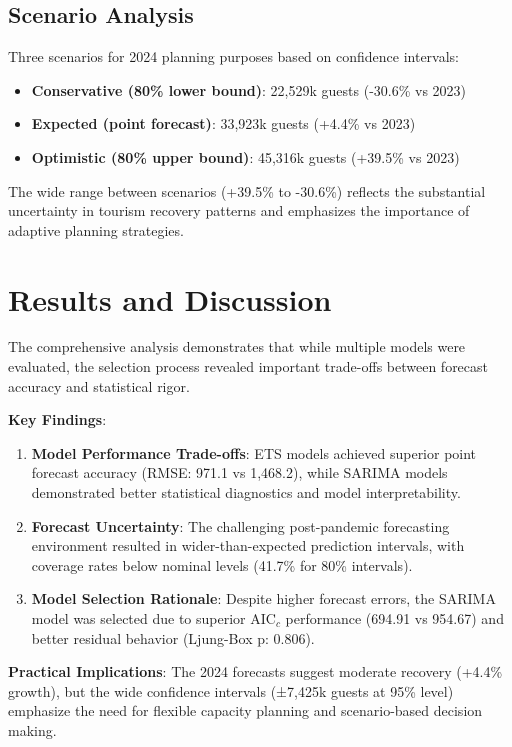 \documentclass[journal]{IEEEtran}
\begin{document}
\subsection{Scenario Analysis}

Three scenarios for 2024 planning purposes based on confidence intervals:
\begin{itemize}
    \item \textbf{Conservative (80\% lower bound)}: 22,529k guests (-30.6\% vs 2023)
    \item \textbf{Expected (point forecast)}: 33,923k guests (+4.4\% vs 2023)
    \item \textbf{Optimistic (80\% upper bound)}: 45,316k guests (+39.5\% vs 2023)
\end{itemize}

The wide range between scenarios (+39.5\% to -30.6\%) reflects the substantial uncertainty in tourism recovery patterns and emphasizes the importance of adaptive planning strategies.

\section{Results and Discussion}

The comprehensive analysis demonstrates that while multiple models were evaluated, the selection process revealed important trade-offs between forecast accuracy and statistical rigor.

\textbf{Key Findings}:

\begin{enumerate}
    \item \textbf{Model Performance Trade-offs}: ETS models achieved superior point forecast accuracy (RMSE: 971.1 vs 1,468.2), while SARIMA models demonstrated better statistical diagnostics and model interpretability.

    \item \textbf{Forecast Uncertainty}: The challenging post-pandemic forecasting environment resulted in wider-than-expected prediction intervals, with coverage rates below nominal levels (41.7\% for 80\% intervals).

    \item \textbf{Model Selection Rationale}: Despite higher forecast errors, the SARIMA model was selected due to superior AIC$_c$ performance (694.91 vs 954.67) and better residual behavior (Ljung-Box p: 0.806).
\end{enumerate}

\textbf{Practical Implications}: The 2024 forecasts suggest moderate recovery (+4.4\% growth), but the wide confidence intervals (±7,425k guests at 95\% level) emphasize the need for flexible capacity planning and scenario-based decision making.
\end{document}
